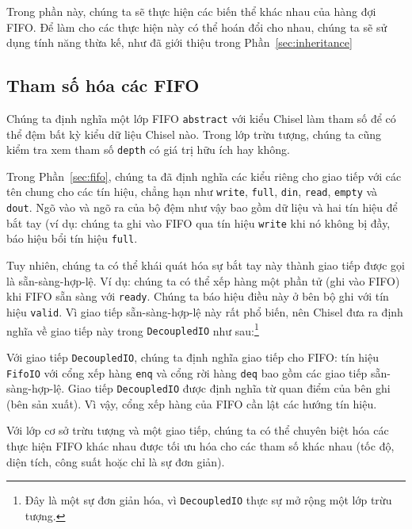 \documentclass[%
    10pt,
    headinclude, footexclude,
    openright, %
    notitlepage,
    cleardoubleempty,
    headsepline,
    pointlessnumbers,
    bibtotoc, idxtotoc,
    ]{scrbook}
\newcommand{\code}[1]{{\small{\texttt{#1}}}}
\newcommand{\codefoot}[1]{{\footnotesize{\texttt{#1}}}}
\begin{document}
Trong phần này, chúng ta sẽ thực hiện các biến thể khác nhau của hàng đợi FIFO. Để làm cho các thực hiện này có thể hoán đổi cho nhau, chúng ta sẽ sử dụng tính năng thừa kế, như đã giới thiệu trong Phần~\ref{sec:inheritance} 

\subsection{Tham số hóa các FIFO}

Chúng ta định nghĩa một lớp FIFO \code{abstract} với kiểu Chisel làm tham số để có thể đệm bất kỳ kiểu dữ liệu Chisel nào. Trong lớp trừu tượng, chúng ta cũng kiểm tra xem tham số \code{depth} có giá trị hữu ích hay không. 


Trong Phần~\ref{sec:fifo}, chúng ta đã định nghĩa các kiểu riêng cho giao tiếp với các tên chung cho các tín hiệu, chẳng hạn như \code{write}, \code{full}, \code{din}, \code{read}, \code{empty} và \code{dout}. Ngõ vào và ngõ ra của bộ đệm như vậy bao gồm dữ liệu và hai tín hiệu để bắt tay (ví dụ: chúng ta ghi vào FIFO qua tín hiệu \code{write} khi nó không bị đầy, báo hiệu bổi tín hiệu \code{full}.

Tuy nhiên, chúng ta có thể khái quát hóa sự bắt tay này thành giao tiếp được gọi là sẵn-sàng-hợp-lệ. Ví dụ: chúng ta có thể xếp hàng một phần tử (ghi vào FIFO) khi FIFO sẵn sàng với \code{ready}. Chúng ta báo hiệu điều này ở bên bộ ghi với tín hiệu \code{valid}. Vì giao tiếp sẵn-sàng-hợp-lệ này rất phổ biến, nên Chisel đưa ra định nghĩa về giao tiếp này trong \code{DecoupledIO} như sau:\footnote{Đây là một sự đơn giản hóa, vì \codefoot{DecoupledIO} thực sự mở rộng một lớp trừu tượng.} 


\noindent Với giao tiếp \code{DecoupledIO}, chúng ta định nghĩa giao tiếp cho FIFO: tín hiệu \code{FifoIO} với cổng xếp hàng \code{enq} và cổng rời hàng \code{deq} bao gồm các giao tiếp sẵn-sàng-hợp-lệ. Giao tiếp \code{DecoupledIO} được định nghĩa từ quan điểm của bên ghi (bên sản xuất). Vì vậy, cổng xếp hàng của FIFO cần lật các hướng tín hiệu.



Với lớp cơ sở trừu tượng và một giao tiếp, chúng ta có thể chuyên biệt hóa các thực hiện FIFO khác nhau được tối ưu hóa cho các tham số khác nhau (tốc độ, diện tích, công suất hoặc chỉ là sự đơn giản). 
\end{document}
